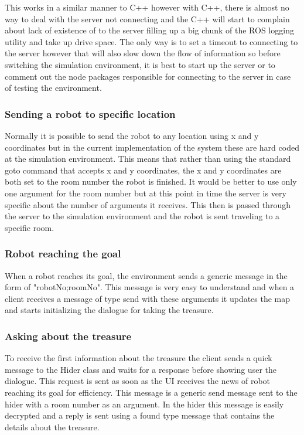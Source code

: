         This works in a similar manner to C++ however with C++, there is almost no way to deal with the server not connecting and the C++ will start to complain about lack of existence of to the server filling up a big chunk of the ROS logging utility and take up drive space. The only way is to set a timeout to connecting to the server however that will also slow down the flow of information so before switching the simulation environment, it is best to start up the server or to comment out the node packages responsible for connecting to the server in case of testing the environment.

      \subsubsection{Sending a robot to specific location}
        Normally it is possible to send the robot to any location using x and y coordinates but in the current implementation of the system these are hard coded at the simulation environment. This means that rather than using the standard goto command that accepts x and y coordinates, the x and y coordinates are both set to the room number the robot is finished. It would be better to use only one argument for the room number but at this point in time the server is very specific about the number of arguments it receives. This then is passed through the server to the simulation environment and the robot is sent traveling to a specific room.

      \subsubsection{Robot reaching the goal}
        When a robot reaches its goal, the environment sends a generic message in the form of "robotNo;roomNo". This message is very easy to understand and when a client receives a message of type send with these arguments it updates the map and starts initializing the dialogue for taking the treasure.

      \subsubsection{Asking about the treasure}
        To receive the first information about the treasure the client sends a quick message to the Hider class and waits for a response before showing user the dialogue. This request is sent as soon as the UI receives the news of robot reaching its goal for efficiency. This message is a generic send message sent to the hider with a room number as an argument. In the hider this message is easily decrypted and a reply is sent using a found type message that contains the details about the treasure.

